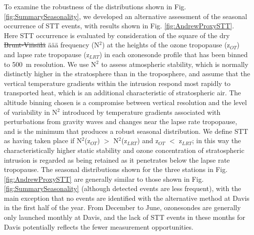 \documentclass[acp, manuscript]{copernicus} %
\providecommand{\DIFadd}[1]{{\protect\color{blue}\uwave{#1}}} %
\providecommand{\DIFdel}[1]{{\protect\color{red}\sout{#1}}}                      %
\providecommand{\DIFaddbegin}{} %
\providecommand{\DIFaddend}{} %
\providecommand{\DIFdelbegin}{} %
\providecommand{\DIFdelend}{} %
\begin{document}
  To examine the robustness of the distributions shown in Fig. \ref{fig:SummarySeasonality}, we developed an alternative assessment of the seasonal occurrence of STT events, with results shown in Fig. \ref{fig:AndrewProxySTT}.
  Here STT occurrence is evaluated by consideration of the square of the dry \DIFdelbegin \DIFdel{Brunt-Viäsälä }\DIFdelend \DIFaddbegin \DIFadd{Brunt-V}\"{a}\DIFadd{is}\"{a}\DIFadd{l}\"{a} \DIFaddend frequency (N$^2$) at the heights of the ozone tropopause (z$_{OT}$) and lapse rate tropopause (z$_{LRT}$) in each ozonesonde profile that has been binned to 500~m resolution.
  We use N$^2$ to assess atmospheric stability, which is normally distinctly higher in the stratosphere than in the troposphere, and assume that the vertical temperature gradients within the intrusion respond most rapidly to transported heat, which is an additional characteristic of stratospheric air.
  The altitude binning chosen is a compromise between vertical resolution and the level of variability in N$^2$ introduced by temperature gradients associated with perturbations from gravity waves and changes near the lapse rate tropopause, and is the minimum that produces a robust seasonal distribution.
  We define STT as having taken place if N$^2$(z$_{OT}$) $>$ N$^2$(z$_{LRT}$) and z$_{OT}$ $<$ z$_{LRT}$; in this way the characteristically higher static stability and ozone concentration of stratospheric intrusion is regarded as being retained as it penetrates below the lapse rate tropopause. 
  The seasonal distributions shown for the three stations in Fig. \ref{fig:AndrewProxySTT} are generally similar to those shown in Fig. \ref{fig:SummarySeasonality} (although detected events are less frequent), with the main exception that no events are identified with the alternative method at Davis in the first half of the year.
  From December to June, ozonesondes are generally only launched monthly at Davis, and the lack of STT events in these months for Davis potentially reflects the fewer measurement opportunities.
\end{document}
